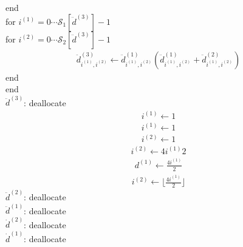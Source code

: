 \documentclass[a4paper,fleqn]{ltjsarticle}
\begin{document}
  end\\
  for $i^{(1)}=0\cdots \mathcal{S}_1[\ddot{d}^{(3)}]-1$\\
    for $i^{(2)}=0\cdots \mathcal{S}_2[\ddot{d}^{(3)}]-1$\\
      \begin{align}
      \ddot{d}^{(3)}_{i^{(1)},i^{(2)}} \leftarrow \ddot{d}^{(1)}_{i^{(1)},i^{(2)}} \left(\ddot{d}^{(1)}_{i^{(1)},i^{(2)}}+\ddot{d}^{(2)}_{i^{(1)},i^{(2)}}\right)
      \end{align}
    end\\
  end\\
  $\ddot{d}^{(3)}$: deallocate\\
  \begin{align}
  i^{(1)} \leftarrow 1
  \end{align}
  \begin{align}
  i^{(1)} \leftarrow 1
  \end{align}
  \begin{align}
  i^{(2)} \leftarrow 1
  \end{align}
  \begin{align}
  i^{(2)} \leftarrow 4 i^{(1)} 2
  \end{align}
  \begin{align}
  d^{(1)} \leftarrow \frac{\displaystyle 4 i^{(1)}}{\displaystyle 2}
  \end{align}
  \begin{align}
  i^{(2)} \leftarrow \lfloor \frac{\displaystyle 4 i^{(1)}}{\displaystyle 2}\rfloor
  \end{align}
  $\ddot{d}^{(2)}$: deallocate\\
  $\ddot{d}^{(1)}$: deallocate\\
  $\dot{d}^{(2)}$: deallocate\\
  $\dot{d}^{(1)}$: deallocate\\
\end{document}
